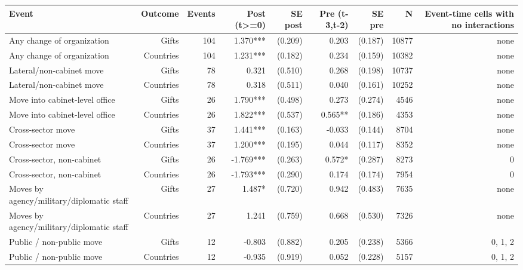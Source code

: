 \begin{tabular}{lrrrrrrrr}
\toprule
Event & Outcome & Events & Post (t>=0) & SE post & Pre (t-3,t-2) & SE pre & N & Event-time cells with no interactions \\
\midrule
Any change of organization & Gifts & 104 & 1.370*** & (0.209) & 0.203 & (0.187) & 10877 & none \\
Any change of organization & Countries & 104 & 1.231*** & (0.182) & 0.234 & (0.159) & 10382 & none \\
Lateral/non-cabinet move & Gifts & 78 & 0.321 & (0.510) & 0.268 & (0.198) & 10737 & none \\
Lateral/non-cabinet move & Countries & 78 & 0.318 & (0.511) & 0.040 & (0.161) & 10252 & none \\
Move into cabinet-level office & Gifts & 26 & 1.790*** & (0.498) & 0.273 & (0.274) & 4546 & none \\
Move into cabinet-level office & Countries & 26 & 1.822*** & (0.537) & 0.565** & (0.186) & 4353 & none \\
Cross-sector move & Gifts & 37 & 1.441*** & (0.163) & -0.033 & (0.144) & 8704 & none \\
Cross-sector move & Countries & 37 & 1.200*** & (0.195) & 0.044 & (0.117) & 8352 & none \\
Cross-sector, non-cabinet & Gifts & 26 & -1.769*** & (0.263) & 0.572* & (0.287) & 8273 & 0 \\
Cross-sector, non-cabinet & Countries & 26 & -1.793*** & (0.290) & 0.174 & (0.174) & 7954 & 0 \\
Moves by agency/military/diplomatic staff & Gifts & 27 & 1.487* & (0.720) & 0.942 & (0.483) & 7635 & none \\
Moves by agency/military/diplomatic staff & Countries & 27 & 1.241 & (0.759) & 0.668 & (0.530) & 7326 & none \\
Public / non-public move & Gifts & 12 & -0.803 & (0.882) & 0.205 & (0.238) & 5366 & 0, 1, 2 \\
Public / non-public move & Countries & 12 & -0.935 & (0.919) & 0.052 & (0.228) & 5157 & 0, 1, 2 \\
\bottomrule
\end{tabular}
\par{}
